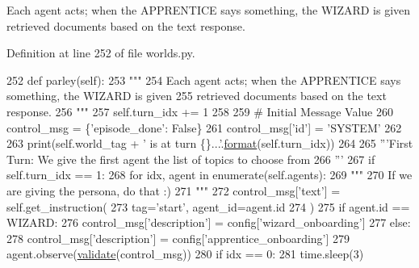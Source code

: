 \begin{DoxyVerb}Each agent acts; when the APPRENTICE says something, the WIZARD is given
retrieved documents based on the text response.
\end{DoxyVerb}
 

Definition at line 252 of file worlds.\+py.


\begin{DoxyCode}
252     \textcolor{keyword}{def }parley(self):
253         \textcolor{stringliteral}{"""}
254 \textcolor{stringliteral}{        Each agent acts; when the APPRENTICE says something, the WIZARD is given}
255 \textcolor{stringliteral}{        retrieved documents based on the text response.}
256 \textcolor{stringliteral}{        """}
257         self.turn\_idx += 1
258 
259         \textcolor{comment}{# Initial Message Value}
260         control\_msg = \{\textcolor{stringliteral}{'episode\_done'}: \textcolor{keyword}{False}\}
261         control\_msg[\textcolor{stringliteral}{'id'}] = \textcolor{stringliteral}{'SYSTEM'}
262 
263         print(self.world\_tag + \textcolor{stringliteral}{' is at turn \{\}...'}.\hyperlink{namespaceparlai_1_1chat__service_1_1services_1_1messenger_1_1shared__utils_a32e2e2022b824fbaf80c747160b52a76}{format}(self.turn\_idx))
264 
265         \textcolor{stringliteral}{'''First Turn: We give the first agent the list of topics to choose from}
266 \textcolor{stringliteral}{        '''}
267         \textcolor{keywordflow}{if} self.turn\_idx == 1:
268             \textcolor{keywordflow}{for} idx, agent \textcolor{keywordflow}{in} enumerate(self.agents):
269                 \textcolor{stringliteral}{"""}
270 \textcolor{stringliteral}{                If we are giving the persona, do that :)}
271 \textcolor{stringliteral}{                """}
272                 control\_msg[\textcolor{stringliteral}{'text'}] = self.get\_instruction(
273                     tag=\textcolor{stringliteral}{'start'}, agent\_id=agent.id
274                 )
275                 \textcolor{keywordflow}{if} agent.id == WIZARD:
276                     control\_msg[\textcolor{stringliteral}{'description'}] = config[\textcolor{stringliteral}{'wizard\_onboarding'}]
277                 \textcolor{keywordflow}{else}:
278                     control\_msg[\textcolor{stringliteral}{'description'}] = config[\textcolor{stringliteral}{'apprentice\_onboarding'}]
279                 agent.observe(\hyperlink{namespaceparlai_1_1core_1_1worlds_afc3fad603b7bce41dbdc9cdc04a9c794}{validate}(control\_msg))
280                 \textcolor{keywordflow}{if} idx == 0:
281                     time.sleep(3)

\end{DoxyCode}

